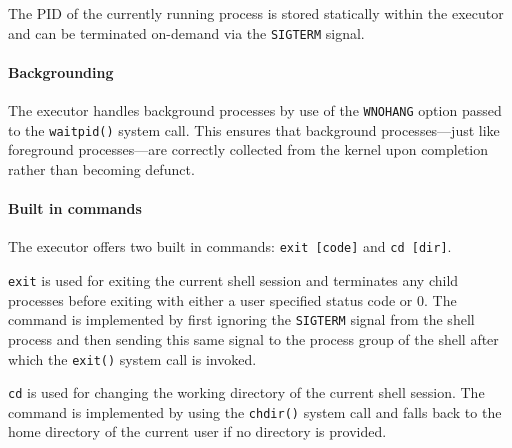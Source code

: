 The PID of the currently running process is stored statically within the executor and can be terminated on-demand via the \texttt{SIGTERM} signal.

\paragraph{Backgrounding} The executor handles background processes by use of the \texttt{WNOHANG} option passed to the \texttt{waitpid()} system call. This ensures that background processes---just like foreground processes---are correctly collected from the kernel upon completion rather than becoming defunct.

\paragraph{Built in commands} The executor offers two built in commands: \texttt{exit [code]} and \texttt{cd [dir]}.

\texttt{exit} is used for exiting the current shell session and terminates any child processes before exiting with either a user specified status code or 0. The command is implemented by first ignoring the \texttt{SIGTERM} signal from the shell process and then sending this same signal to the process group of the shell after which the \texttt{exit()} system call is invoked.

\texttt{cd} is used for changing the working directory of the current shell session. The command is implemented by using the \texttt{chdir()} system call and falls back to the home directory of the current user if no directory is provided.
